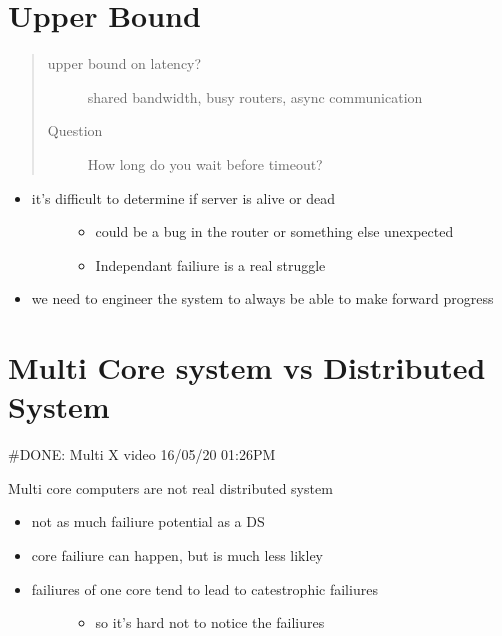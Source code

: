 \documentclass[letterpaper,10pt,english]{sphinxmanual}
\begin{document}
\section{Upper Bound}
\label{\detokenize{week2:upper-bound}}\begin{quote}\begin{description}
\item[{upper bound on latency?}] \leavevmode
shared bandwidth, busy routers, async communication

\item[{Question}] \leavevmode
How long do you wait before timeout?

\end{description}\end{quote}
\begin{itemize}
\item {} \begin{description}
\item[{it’s difficult to determine if server is alive or dead}] \leavevmode\begin{itemize}
\item {} 
could be a bug in the router or something else unexpected

\item {} 
Independant failiure is a real struggle

\end{itemize}

\end{description}

\item {} 
we need to engineer the system to always be able to make forward progress

\end{itemize}


\section{Multi Core system vs Distributed System}
\label{\detokenize{week2:multi-core-system-vs-distributed-system}}
\#DONE: Multi X video 16/05/20 01:26PM

Multi core computers are not real distributed system
\begin{itemize}
\item {} 
not as much failiure potential as a DS

\item {} 
core failiure can happen, but is much less likley

\item {} \begin{description}
\item[{failiures of one core tend to lead to catestrophic failiures}] \leavevmode\begin{itemize}
\item {} 
so it’s hard not to notice the failiures

\end{itemize}

\end{description}

\end{itemize}
\end{document}
